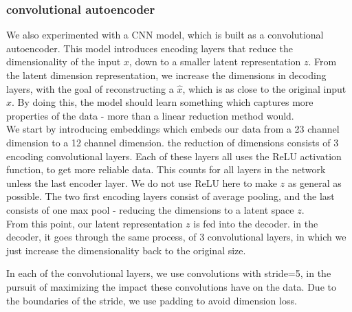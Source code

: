 \subsubsection{convolutional autoencoder}

We also experimented with a CNN model, which is built as a convolutional autoencoder. This model introduces encoding layers that reduce the dimensionality of the input $x$, down to a smaller latent representation $z$. From the latent dimension representation, we increase the dimensions in decoding layers, with the goal of reconstructing a $\hat{x}$, which is as close to the original input $x$. By doing this, the model should learn something which captures more properties of the data - more than a linear reduction method would. \\

\noindent
We start by introducing embeddings which embeds our data from a 23 channel dimension to a 12 channel dimension. the reduction of dimensions consists of 3 encoding convolutional layers. Each of these layers all uses the ReLU activation function, to get more reliable data. This counts for all layers in the network unless the last encoder layer. We do not use ReLU here to make $z$ as general as possible. The two first encoding layers consist of average pooling, and the last consists of one max pool - reducing the dimensions to a latent space $z$.  \\


\noindent
From this point, our latent representation $z$ is fed into the decoder. in the decoder, it goes through the same process, of 3 convolutional layers, in which we just increase the dimensionality back to the original size.

\noindent
In each of the convolutional layers, we use convolutions with stride=5, in the pursuit of maximizing the impact these convolutions have on the data. Due to the boundaries of the stride, we use padding to avoid dimension loss.\\



